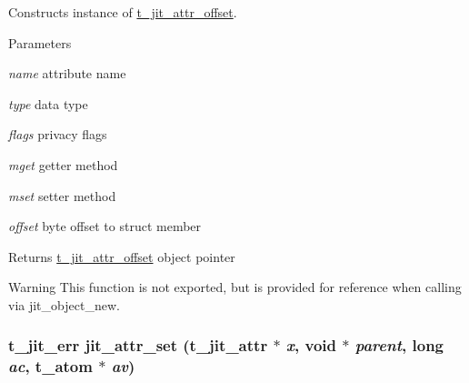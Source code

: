 Constructs instance of \hyperlink{structt__jit__attr__offset}{t\_\-jit\_\-attr\_\-offset}. 
\begin{DoxyParams}{Parameters}
\item[{\em name}]attribute name \item[{\em type}]data type \item[{\em flags}]privacy flags \item[{\em mget}]getter method \item[{\em mset}]setter method \item[{\em offset}]byte offset to struct member\end{DoxyParams}
\begin{DoxyReturn}{Returns}
\hyperlink{structt__jit__attr__offset}{t\_\-jit\_\-attr\_\-offset} object pointer
\end{DoxyReturn}
\begin{DoxyWarning}{Warning}
This function is not exported, but is provided for reference when calling via jit\_\-object\_\-new. 
\end{DoxyWarning}
\hypertarget{group__attrmod_ga04bb490b921cfd22290b8513d63702ec}{
\subsubsection[{jit\_\-attr\_\-set}]{\setlength{\rightskip}{0pt plus 5cm}t\_\-jit\_\-err jit\_\-attr\_\-set ({\bf t\_\-jit\_\-attr} $\ast$ {\em x}, \/  void $\ast$ {\em parent}, \/  long {\em ac}, \/  {\bf t\_\-atom} $\ast$ {\em av})}}
\label{group__attrmod_ga04bb490b921cfd22290b8513d63702ec}


